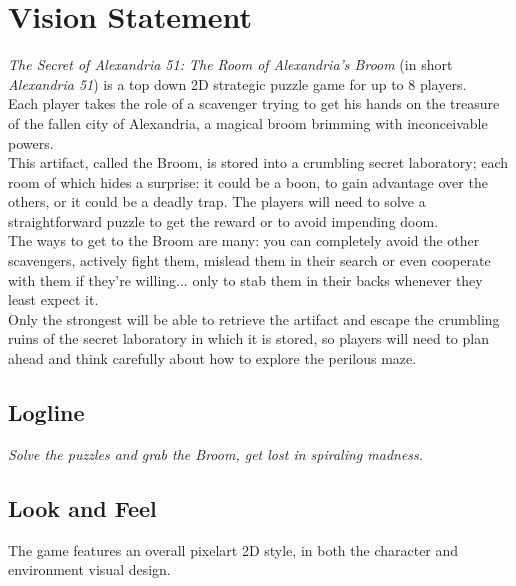 \section{Vision Statement}

\textit{The Secret of Alexandria 51: The Room of Alexandria’s Broom} (in short \textit{Alexandria 51}) is a top down 2D strategic puzzle game for up to 8 players. \\

Each player takes the role of a scavenger trying to get his hands on the treasure of the fallen city of Alexandria, a magical broom brimming with inconceivable powers. \\

This artifact, called the Broom, is stored into a crumbling secret laboratory; each room of which hides a surprise: it could be a boon, to gain advantage over the others, or it could be a deadly trap. The players will need to solve a straightforward puzzle to get the reward or to avoid impending doom. \\

The ways to get to the Broom are many: you can completely avoid the other scavengers, actively fight them, mislead them in their search or even cooperate with them if they're willing... only to stab them in their backs whenever they least expect it. \\

Only the strongest will be able to retrieve the artifact and escape the crumbling ruins of the secret laboratory in which it is stored, so players will need to plan ahead and think carefully about how to explore the perilous maze.

\subsection{Logline}

\textit{Solve the puzzles and grab the Broom, get lost in spiraling madness.}

\subsection{Look and Feel}

The game features an overall pixelart 2D style, in both the character and environment visual design. 




